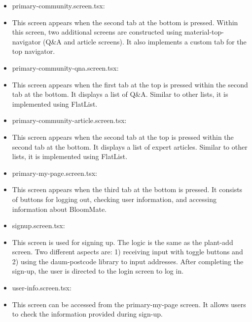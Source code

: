 \documentclass[conference, a4paper]{IEEEtran}
\begin{document}
\begin{enumerate}
\begin{enumerate}
\begin{itemize}
        \item primary-community.screen.tsx: 
        \item[] This screen appears when the second tab at the bottom is pressed. Within this screen, two additional screens are constructed using material-top-navigator (Q\&A and article screens). It also implements a custom tab for the top navigator.\\

        \item primary-community-qna.screen.tsx: 
        \item[] This screen appears when the first tab at the top is pressed within the second tab at the bottom. It displays a list of Q\&A. Similar to other lists, it is implemented using FlatList.

        \item primary-community-article.screen.tsx: 
        \item[] This screen appears when the second tab at the top is pressed within the second tab at the bottom. It displays a list of expert articles. Similar to other lists, it is implemented using FlatList.\\

        \item primary-my-page.screen.tsx: 
        \item[] This screen appears when the third tab at the bottom is pressed. It consists of buttons for logging out, checking user information, and accessing information about BloomMate.\\

        \item signup.screen.tsx: 
        \item[] This screen is used for signing up. The logic is the same as the plant-add screen. Two different aspects are: 1) receiving input with toggle buttons and 2) using the daum-postcode library to input addresses. After completing the sign-up, the user is directed to the login screen to log in. \\

        \item user-info.screen.tsx: 
        \item[] This screen can be accessed from the primary-my-page screen. It allows users to check the information provided during sign-up. \\
    \end{itemize}


\end{enumerate}
\end{enumerate}
\end{document}
